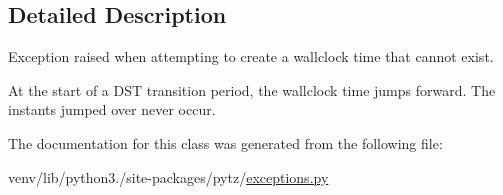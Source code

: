 \subsection{Detailed Description}
\begin{DoxyVerb}Exception raised when attempting to create a wallclock time that
cannot exist.

At the start of a DST transition period, the wallclock time jumps forward.
The instants jumped over never occur.
\end{DoxyVerb}
 

The documentation for this class was generated from the following file\+:\begin{DoxyCompactItemize}
\item 
venv/lib/python3./site-\/packages/pytz/\hyperlink{pytz_2exceptions_8py}{exceptions.\+py}\end{DoxyCompactItemize}
